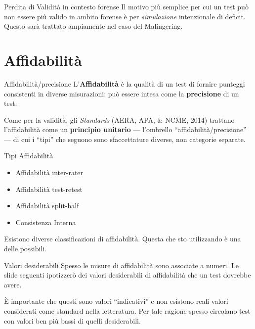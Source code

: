 \documentclass[
  ignorenonframetext,
  aspectratio=169,
]{beamer}
\providecommand{\tightlist}{%
  \setlength{\itemsep}{0pt}\setlength{\parskip}{0pt}}
\begin{document}
\begin{frame}{Perdita di Validità in contesto forense}
\label{perdita-di-validituxe0-in-contesto-forense}
Il motivo più semplice per cui un test può non essere più valido in
ambito forense è per \emph{simulazione} intenzionale di deficit. Questo
sarà trattato ampiamente nel caso del Malingering.
\end{frame}

\section{Affidabilità}\label{affidabilituxe0}

\begin{frame}{Affidabilità/precisione}
\label{affidabilituxe0precisione}
L'\textbf{Affidabilità} è la qualità di un test di fornire punteggi
consistenti in diverse misurazioni: può essere intesa come la
\textbf{precisione} di un test.

Come per la validità, gli \emph{Standards} (AERA, APA, \& NCME, 2014)
trattano l'affidabilità come un \textbf{principio unitario} ---
l'ombrello ``affidabilità/precisione'' --- di cui i ``tipi'' che seguono
sono sfaccettature diverse, non categorie separate.
\end{frame}

\begin{frame}{Tipi Affidabilità}
\label{tipi-affidabilituxe0}
\begin{itemize}
\tightlist
\item
  Affidabilità inter-rater
\item
  Affidabilità test-retest
\item
  Affidabilità split-half
\item
  Consistenza Interna
\end{itemize}

Esistono diverse classificazioni di affidabilità. Questa che sto
utilizzando è una delle possibili.
\end{frame}

\begin{frame}{Valori desiderabili}
\label{valori-desiderabili}
Spesso le misure di affidabilità sono associate a numeri. Le slide
seguenti ipotizzerò dei valori desiderabili di affidabilità che un test
dovrebbe avere.

È importante che questi sono valori ``indicativi'' e non esistono reali
valori considerati come standard nella letteratura. Per tale ragione
spesso circolano test con valori ben più bassi di quelli desiderabili.
\end{frame}
\end{document}
